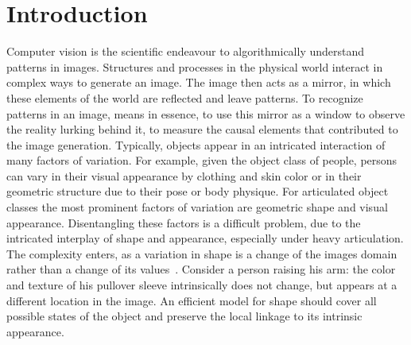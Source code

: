 \chapter{Introduction}
	Computer vision is the scientific endeavour to algorithmically understand patterns in images.
	Structures and processes in the physical world interact in complex ways to generate an image. The image then acts as a mirror, in which these elements of the world are reflected and leave patterns.
	To recognize patterns in an image, means in essence, to use this mirror as a window to observe the reality lurking behind it, \ie to measure the causal elements that contributed to the image generation.
	Typically, objects appear in an intricated interaction of many factors of variation.
	For example, given the object class of people, persons can vary in their visual appearance by clothing and skin color or in their geometric structure due to their pose or body physique. 
	For articulated object classes the most prominent factors of variation are geometric shape and visual appearance.
	Disentangling these factors is a difficult problem, due to the intricated interplay of shape and appearance, especially under heavy articulation.
	The complexity enters, as a variation in shape is a change of the images domain rather than a change of its values~\cite{shu18shapeappear}.
	Consider a person raising his arm: the color and texture of his pullover sleeve intrinsically does not change, but appears at a different location in the image. An efficient model for shape should cover all possible states of the object and preserve the local linkage to its intrinsic appearance.

